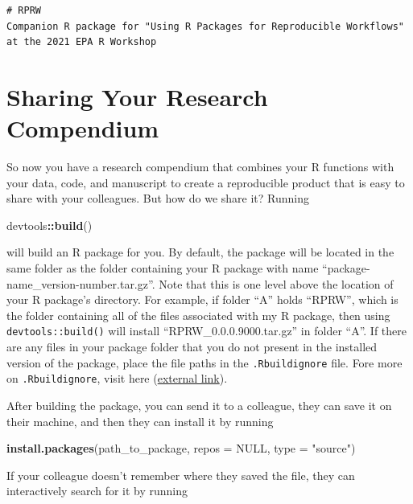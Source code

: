 \documentclass[
]{book}
\newenvironment{Shaded}{\begin{snugshade}}{\end{snugshade}}
\newcommand{\DataTypeTok}[1]{\textcolor[rgb]{0.13,0.29,0.53}{#1}}
\newcommand{\KeywordTok}[1]{\textcolor[rgb]{0.13,0.29,0.53}{\textbf{#1}}}
\newcommand{\NormalTok}[1]{#1}
\newcommand{\OperatorTok}[1]{\textcolor[rgb]{0.81,0.36,0.00}{\textbf{#1}}}
\newcommand{\OtherTok}[1]{\textcolor[rgb]{0.56,0.35,0.01}{#1}}
\newcommand{\StringTok}[1]{\textcolor[rgb]{0.31,0.60,0.02}{#1}}
\begin{document}
\begin{verbatim}
# RPRW
Companion R package for "Using R Packages for Reproducible Workflows" at the 2021 EPA R Workshop
\end{verbatim}

\hypertarget{sharing-rc}{%
\section{Sharing Your Research Compendium}\label{sharing-rc}}

So now you have a research compendium that combines your R functions with your data, code, and manuscript to create a reproducible product that is easy to share with your colleagues. But how do we share it? Running

\begin{Shaded}
\begin{Highlighting}[]
\NormalTok{devtools}\OperatorTok{::}\KeywordTok{build}\NormalTok{()}
\end{Highlighting}
\end{Shaded}

will build an R package for you. By default, the package will be located in the same folder as the folder containing your R package with name ``package-name\_version-number.tar.gz''. Note that this is one level above the location of your R package's directory. For example, if folder ``A'' holds ``RPRW'', which is the folder containing all of the files associated with my R package, then using \texttt{devtools::build()} will install ``RPRW\_0.0.0.9000.tar.gz'' in folder ``A''. If there are any files in your package folder that you do not present in the installed version of the package, place the file paths in the \texttt{.Rbuildignore} file. Fore more on \texttt{.Rbuildignore}, visit here (\href{https://r-pkgs.org/package-structure-state.html\#rbuildignore}{external link}).

After building the package, you can send it to a colleague, they can save it on their machine, and then they can install it by running

\begin{Shaded}
\begin{Highlighting}[]
\KeywordTok{install.packages}\NormalTok{(path_to_package, }\DataTypeTok{repos =} \OtherTok{NULL}\NormalTok{, }\DataTypeTok{type =} \StringTok{"source"}\NormalTok{)}
\end{Highlighting}
\end{Shaded}

If your colleague doesn't remember where they saved the file, they can interactively search for it by running
\end{document}
